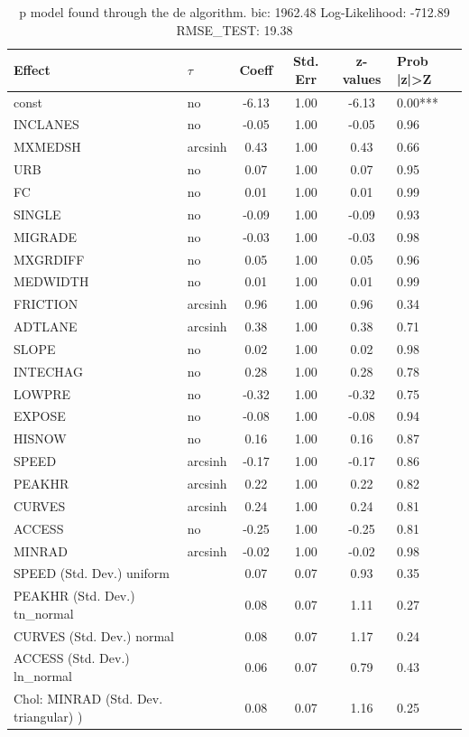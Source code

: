\begin{table}
	\caption{p model found through the de algorithm. bic: 1962.48 Log-Likelihood: -712.89 RMSE_TEST: 19.38}
	\begin{center}
		\begin{tabular}{|l|l|c|c|c|l|}
			\hline
			Effect & $\tau$ & Coeff & Std. Err & z-values & Prob |z|>Z \\
			\hline
			const & no & -6.13 & 1.00 & -6.13 & 0.00*** \\
			\hline
			INCLANES & no & -0.05 & 1.00 & -0.05 & 0.96 \\
			\hline
			MXMEDSH & arcsinh & 0.43 & 1.00 & 0.43 & 0.66 \\
			\hline
			URB & no & 0.07 & 1.00 & 0.07 & 0.95 \\
			\hline
			FC & no & 0.01 & 1.00 & 0.01 & 0.99 \\
			\hline
			SINGLE & no & -0.09 & 1.00 & -0.09 & 0.93 \\
			\hline
			MIGRADE & no & -0.03 & 1.00 & -0.03 & 0.98 \\
			\hline
			MXGRDIFF & no & 0.05 & 1.00 & 0.05 & 0.96 \\
			\hline
			MEDWIDTH & no & 0.01 & 1.00 & 0.01 & 0.99 \\
			\hline
			FRICTION & arcsinh & 0.96 & 1.00 & 0.96 & 0.34 \\
			\hline
			ADTLANE & arcsinh & 0.38 & 1.00 & 0.38 & 0.71 \\
			\hline
			SLOPE & no & 0.02 & 1.00 & 0.02 & 0.98 \\
			\hline
			INTECHAG & no & 0.28 & 1.00 & 0.28 & 0.78 \\
			\hline
			LOWPRE & no & -0.32 & 1.00 & -0.32 & 0.75 \\
			\hline
			EXPOSE & no & -0.08 & 1.00 & -0.08 & 0.94 \\
			\hline
			HISNOW & no & 0.16 & 1.00 & 0.16 & 0.87 \\
			\hline
			SPEED & arcsinh & -0.17 & 1.00 & -0.17 & 0.86 \\
			\hline
			PEAKHR & arcsinh & 0.22 & 1.00 & 0.22 & 0.82 \\
			\hline
			CURVES & arcsinh & 0.24 & 1.00 & 0.24 & 0.81 \\
			\hline
			ACCESS & no & -0.25 & 1.00 & -0.25 & 0.81 \\
			\hline
			MINRAD & arcsinh & -0.02 & 1.00 & -0.02 & 0.98 \\
			\hline
			SPEED (Std. Dev.) uniform &  & 0.07 & 0.07 & 0.93 & 0.35 \\
			\hline
			PEAKHR (Std. Dev.) tn_normal &  & 0.08 & 0.07 & 1.11 & 0.27 \\
			\hline
			CURVES (Std. Dev.) normal &  & 0.08 & 0.07 & 1.17 & 0.24 \\
			\hline
			ACCESS (Std. Dev.) ln_normal &  & 0.06 & 0.07 & 0.79 & 0.43 \\
			\hline
			 Chol: MINRAD (Std. Dev. triangular) ) &  & 0.08 & 0.07 & 1.16 & 0.25 \\
			\hline
		\end{tabular}
	\end{center}
\end{table}